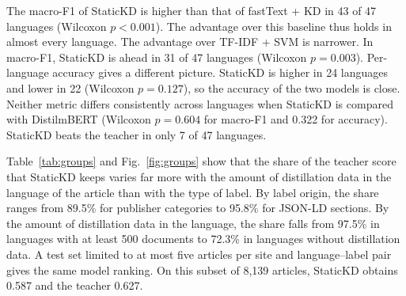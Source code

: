 \documentclass[journal]{IEEEtran}
\begin{document}
The macro-F1 of StaticKD is higher than that of fastText + KD in 43 of 47 languages (Wilcoxon $p<0.001$). The advantage over this baseline thus holds in almost every language. The advantage over TF-IDF + SVM is narrower. In macro-F1, StaticKD is ahead in 31 of 47 languages (Wilcoxon $p=0.003$). Per-language accuracy gives a different picture. StaticKD is higher in 24 languages and lower in 22 (Wilcoxon $p=0.127$), so the accuracy of the two models is close. Neither metric differs consistently across languages when StaticKD is compared with DistilmBERT (Wilcoxon $p=0.604$ for macro-F1 and 0.322 for accuracy). StaticKD beats the teacher in only 7 of 47 languages.

Table~\ref{tab:groups} and Fig.~\ref{fig:groups} show that the share of the teacher score that StaticKD keeps varies far more with the amount of distillation data in the language of the article than with the type of label. By label origin, the share ranges from 89.5\% for publisher categories to 95.8\% for JSON-LD sections. By the amount of distillation data in the language, the share falls from 97.5\% in languages with at least 500 documents to 72.3\% in languages without distillation data. A test set limited to at most five articles per site and language--label pair gives the same model ranking. On this subset of 8,139 articles, StaticKD obtains 0.587 and the teacher 0.627.
\end{document}

